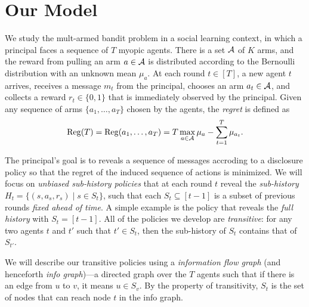 \section{Our Model}
\label{sec:model}

We study the mult-armed bandit problem in a social learning context,
in which a principal faces a sequence of $T$ myopic agents. There is a
set $\mathcal{A}$ of $K$ arms, and the reward from pulling an arm $a\in \mathcal{A}$ is
distributed according to the Bernoulli distribution with an unknown
mean $\mu_a$.%
At each round $t\in [T]$, a new agent $t$ arrives, receives a message
$m_t$ from the principal, chooses an arm $a_t\in \mathcal{A}$, and collects a
reward $r_t\in \{0,1\}$ that is immediately observed by the
principal. Given any sequence of arms $\{a_1, \ldots, a_T\}$ chosen by
the agents, the \emph{regret} is defined as
\[
  \mathrm{Reg}(T)= \mathrm{Reg}(a_1, \ldots , a_T) = T \max_{a\in \mathcal{A}} \mu_a -
  \sum_{t=1}^T \mu_{a_t}.
\]





 The principal's goal is to reveals
a sequence of messages accroding to a disclosure policy so that the
regret of the induced sequence of actions is minimized. We will focus
on \emph{unbiased sub-history policies} that at each round $t$ reveal
the \emph{sub-history} $H_t = \{(s, a_s, r_s)\mid s \in S_t\}$, such
that each $S_t\subseteq [t-1]$ is a subset of previous rounds
\emph{fixed ahead of time}. A simple example is the policy that
reveals the \emph{full history} with $S_t = [t-1]$.  All of the
policies we develop are \emph{transitive}: for any two agents $t$ and
$t'$ such that $t'\in S_t$, then the sub-history of $S_t$ contains
that of $S_{t'}$.


 We will describe our transitive
policies using a \emph{information flow graph} (and henceforth
\emph{info graph})---a directed graph over the $T$ agents such that if
there is an edge from $u$ to $v$, it means $u\in S_v$. By the property
of transitivity, $S_t$ is the set of nodes that can reach node $t$ in
the info graph.

